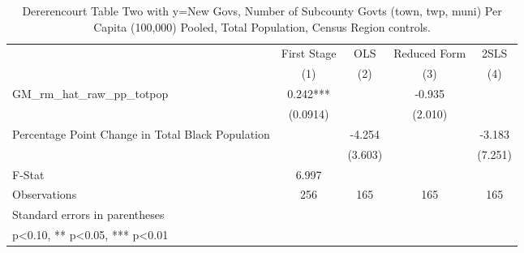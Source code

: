 \begin{table}[htbp]\centering
\def\sym#1{\ifmmode^{#1}\else\(^{#1}\)\fi}
\caption{Dererencourt Table Two with y=New Govs, Number of Subcounty Govts (town, twp, muni) Per Capita (100,000) Pooled, Total Population, Census Region controls.}
\begin{tabular}{l*{4}{c}}
\toprule
                    & First Stage   &         OLS   &Reduced Form   &        2SLS   \\
                    &\multicolumn{1}{c}{(1)}   &\multicolumn{1}{c}{(2)}   &\multicolumn{1}{c}{(3)}   &\multicolumn{1}{c}{(4)}   \\
\midrule
GM\_rm\_hat\_raw\_pp\_totpop&       0.242***&               &      -0.935   &               \\
                    &    (0.0914)   &               &     (2.010)   &               \\
\addlinespace
Percentage Point Change in Total Black Population&               &      -4.254   &               &      -3.183   \\
                    &               &     (3.603)   &               &     (7.251)   \\
\midrule
F-Stat              &       6.997   &               &               &               \\
Observations        &         256   &         165   &         165   &         165   \\
\bottomrule
\multicolumn{5}{l}{\footnotesize Standard errors in parentheses}\\
\multicolumn{5}{l}{\footnotesize * p<0.10, ** p<0.05, *** p<0.01}\\
\end{tabular}
\end{table}
